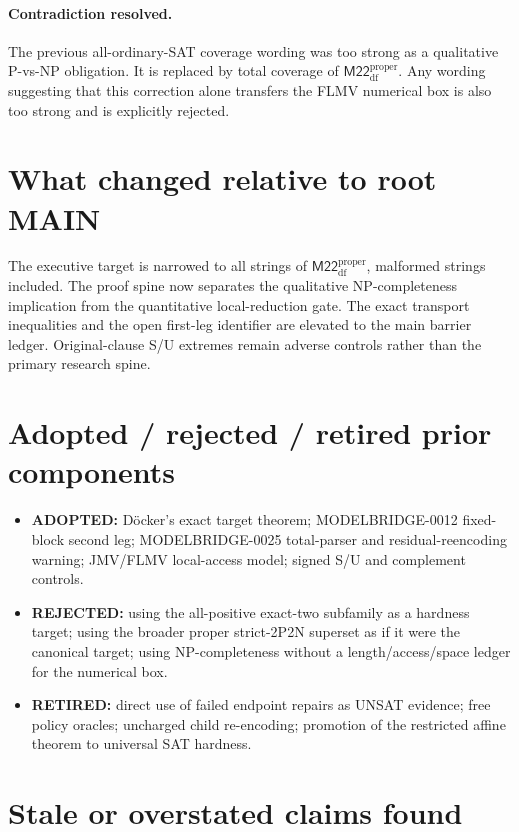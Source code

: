 \documentclass[11pt]{article}
\newcommand{\M}{\mathsf{M22}^{\mathrm{proper}}_{\mathrm{df}}}
\begin{document}
\paragraph{Contradiction resolved.}
The previous all-ordinary-SAT coverage wording was too strong as a qualitative P-vs-NP
obligation.  It is replaced by total coverage of $\M$.  Any wording suggesting that
this correction alone transfers the FLMV numerical box is also too strong and is
explicitly rejected.

\section{What changed relative to root MAIN}

The executive target is narrowed to all strings of $\M$, malformed strings included.
The proof spine now separates the qualitative NP-completeness implication from the
quantitative local-reduction gate.  The exact transport inequalities and the open
first-leg identifier are elevated to the main barrier ledger.  Original-clause S/U
extremes remain adverse controls rather than the primary research spine.

\section{Adopted / rejected / retired prior components}

\begin{itemize}
\item \textbf{ADOPTED:} D\"ocker's exact target theorem; MODELBRIDGE-0012 fixed-block
second leg; MODELBRIDGE-0025 total-parser and residual-reencoding warning; JMV/FLMV
local-access model; signed S/U and complement controls.
\item \textbf{REJECTED:} using the all-positive exact-two subfamily as a hardness target;
using the broader proper strict-2P2N superset as if it were the canonical target;
using NP-completeness without a length/access/space ledger for the numerical box.
\item \textbf{RETIRED:} direct use of failed endpoint repairs as UNSAT evidence; free
policy oracles; uncharged child re-encoding; promotion of the restricted affine theorem
to universal SAT hardness.
\end{itemize}

\section{Stale or overstated claims found}
\end{document}
